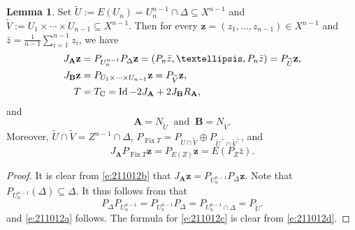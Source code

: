 \documentclass[11pt]{article}
\newcommand{\bz}{\ensuremath{\mathbf{z}}}
\newcommand{\Fix}{\ensuremath{\operatorname{Fix}}}
\newcommand{\Id}{\ensuremath{\operatorname{Id}}}
\newcommand{\tc}{\ensuremath{T_{\text{\scriptsize C}}}}
\newcommand{\bA}{\ensuremath{{\mathbf{A}}}}
\newcommand{\bB}{\ensuremath{{\mathbf{B}}}}
\theoremstyle{definition}
\newtheorem{lemma}[theorem]{Lemma}
\providecommand{\Id}{\operatorname{{ Id}}}
\providecommand{\Id}{\operatorname{Id}}
\begin{document}
{\begin{lemma}
\label{l:Campoycvg}
Set $\widetilde{U} := E(U_n) = U_n^{n-1}\cap\Delta\subseteq X^{n-1}$ and
$\widetilde{V} := U_1\times\cdots\times U_{n-1}\subseteq X^{n-1}$. 
Then for every $\bz = (z_1,\ldots,z_{n-1})\in X^{n-1}$ and 
$\bar{z}=\tfrac{1}{n-1}\sum_{i=1}^{n-1}z_i$, we have 
\begin{subequations}
\label{e:211012ac}
\begin{align}
\label{e:211012a}
J_{\bA}\bz &=  P_{U_n^{n-1}}P_\Delta\bz = (P_n\bar{z},\ldots,P_n\bar{z})
= P_{\widetilde{U}}\bz,\\
J_{\bB}\bz &= P_{U_1\times\cdots\times U_{n-1}}\bz 
= P_{\widetilde{V}}\bz, \label{e:211012c}\\
 T &= \tc = \Id-2J_{\bA} + 2J_{\bB}R_{\bA}, \label{e:211012f2}
\end{align}
\end{subequations}
and 
\begin{equation}
\label{e:220201a}
\bA = N_{\widetilde{U}}
\;\;\text{and}\;\;
\bB = N_{\widetilde{V}}. 
\end{equation}
Moreover, 
$\widetilde{U}\cap \widetilde{V}= Z^{n-1}\cap\Delta$,
$P_{\Fix T} = P_{\widetilde{U}\cap \widetilde{V}} 
\oplus P_{{\widetilde{U}}^\perp \cap {\widetilde{V}}^\perp}$,
 and 
\begin{equation}
\label{e:211012h}
J_{\bA}P_{\Fix T}\bz = P_{E(Z)}\bz = E(P_Z\bar{z}). 
\end{equation}
\end{lemma}
\begin{proof}
It is clear from \cref{e:211012b} that $J_{\bA}\bz =  P_{U_n^{n-1}}P_\Delta\bz$. 
Note that $P_{U_n^{n-1}}(\Delta) \subseteq \Delta$. 
It thus follows from \cite[Lemma~9.2]{Deutsch} that 
\begin{equation}\label{e:211115a}
P_\Delta P_{U_n^{n-1}} = P_{U_n^{n-1}}P_\Delta = P_{U_n^{n-1}\cap \Delta} 
= P_{\widetilde{U}}. 
\end{equation}
and \cref{e:211012a} follows. 
The formula for \cref{e:211012c} is clear from \cref{e:211012d}.


\end{proof}}
\end{document}
